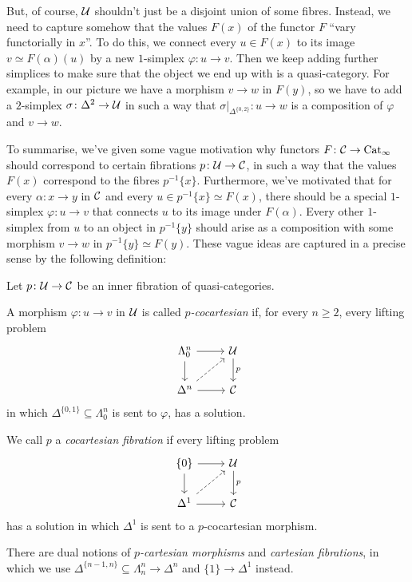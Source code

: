 \begin{numpar}
	But, of course, $\mathcal{U}$ shouldn't just be a disjoint union of some fibres. Instead, we need to capture somehow that the values $F(x)$ of the functor $F$ \enquote{vary functorially in $x$}. To do this, we connect every $u\in F(x)$ to its image $v\simeq F(\alpha)(u)$ by a new $1$-simplex $\varphi\colon u\rightarrow v$. Then we keep adding further simplices to make sure that the object we end up with is a quasi-category. For example, in our picture we have a morphism $v\rightarrow w$ in $F(y)$, so we have to add a $2$-simplex $\sigma\colon \Delta^2\rightarrow \mathcal{U}$ in such a way that $\sigma|_{\Delta^{\{0,2\}}}\colon u\rightarrow w$ is a composition of $\varphi$ and $v\rightarrow w$.
	
	To summarise, we've given some vague motivation why functors $F\colon \mathcal{C}\rightarrow\mathrm{Cat}_\infty$ should correspond to certain fibrations $p\colon \mathcal{U}\rightarrow \mathcal{C}$, in such a way that the values $F(x)$ correspond to the fibres $p^{-1}\{x\}$. Furthermore, we've motivated that for every $\alpha\colon x\rightarrow y$ in $\mathcal{C}$ and every $u\in p^{-1}\{x\}\simeq F(x)$, there should be a special $1$-simplex $\varphi\colon u\rightarrow v$ that connects $u$ to its image under $F(\alpha)$. Every other $1$-simplex from $u$ to an object in $p^{-1}\{y\}$ should arise as a composition with some morphism $v\rightarrow w$ in $p^{-1}\{y\}\simeq F(y)$. These vague ideas are captured in a precise sense by the following definition:
\end{numpar}
\begin{defi}\label{def:Cocartesian}
	Let $p\colon \mathcal{U}\rightarrow\mathcal{C}$ be an inner fibration of quasi-categories.
	\begin{alphanumerate}
		\item A morphism $\varphi\colon u\rightarrow v$ in $\mathcal{U}$ is called \emph{$p$-cocartesian} if, for every $n\geqslant 2$, every lifting problem\label{enum:CocartesianMorphism}
		\begin{equation*}
			\begin{tikzcd}
				\Lambda_0^n\rar\dar & \Uu\dar["p"]\\
				\Delta^n\urar[dashed]\rar & \Cc
			\end{tikzcd}
		\end{equation*}
		in which $\Delta^{\{0,1\}}\subseteq \Lambda_0^n$ is sent to $\varphi$, has a solution.
		\item We call $p$ a \emph{cocartesian fibration} if every lifting problem\label{enum:CocartesianFibration}
		\begin{equation*}
			\begin{tikzcd}
				\{0\}\rar\dar & \Uu\dar["p"]\\
				\Delta^1\urar[dashed]\rar & \Cc
			\end{tikzcd}
		\end{equation*}
		has a solution in which $\Delta^1$ is sent to a $p$-cocartesian morphism.
	\end{alphanumerate}
	There are dual notions of \emph{$p$-cartesian morphisms} and \emph{cartesian fibrations}, in which we use $\Delta^{\{n-1,n\}}\subseteq \Lambda_n^n\rightarrow \Delta^n$ and $\{1\}\rightarrow \Delta^1$ instead.
\end{defi}
